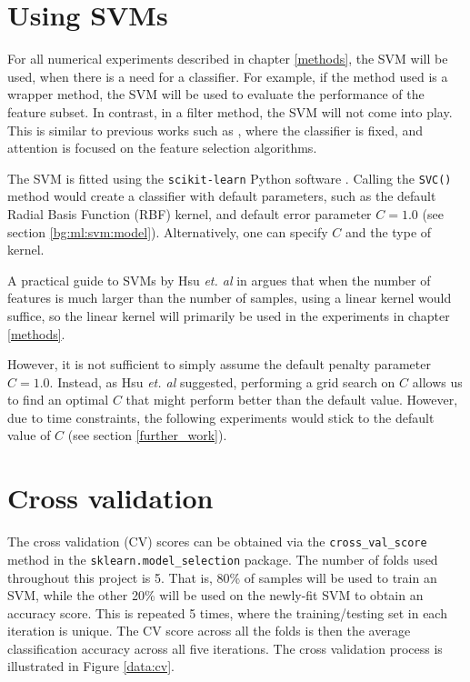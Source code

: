 \documentclass[12pt, twoside, a4paper]{report}
\begin{document}
\section{Using SVMs} \label{data:svms}

For all numerical experiments described in chapter \ref{methods}, the SVM will be used, when there is a need for a classifier. For example, if the method used is a wrapper method, the SVM will be used to evaluate the performance of the feature subset. In contrast, in a filter method, the SVM will not come into play. This is similar to previous works such as \cite{RefWorks:216}, where the classifier is fixed, and attention is focused on the feature selection algorithms.

The SVM is fitted using the \texttt{scikit-learn} Python software \cite{scikit-learn}. Calling the \texttt{SVC()} method would create a classifier with default parameters, such as the default Radial Basis Function (RBF) kernel, and default error parameter $C=1.0$ (see section \ref{bg:ml:svm:model}). Alternatively, one can specify $C$ and the type of kernel.

A practical guide to SVMs by Hsu \textit{et. al} in \cite{RefWorks:128} argues that when the number of features is much larger than the number of samples, using a linear kernel would suffice, so the linear kernel will primarily be used in the experiments in chapter \ref{methods}.


However, it is not sufficient to simply assume the default penalty parameter $C=1.0$. Instead, as Hsu \textit{et. al} suggested, performing a grid search on $C$ allows us to find an optimal $C$ that might perform better than the default value. However, due to time constraints, the following experiments would stick to the default value of $C$ (see section \ref{further_work}).



\section{Cross validation}
The cross validation (CV) scores can be obtained via the \texttt{cross\_val\_score} method in the \texttt{sklearn.model\_selection} package. The number of folds used throughout this project is 5. That is, 80\% of samples will be used to train an SVM, while the other 20\% will be used on the newly-fit SVM to obtain an accuracy score. This is repeated 5 times, where the training/testing set in each iteration is unique. The CV score across all the folds is then the average classification accuracy across all five iterations. The cross validation process is illustrated in Figure \ref{data:cv}.
\end{document}
